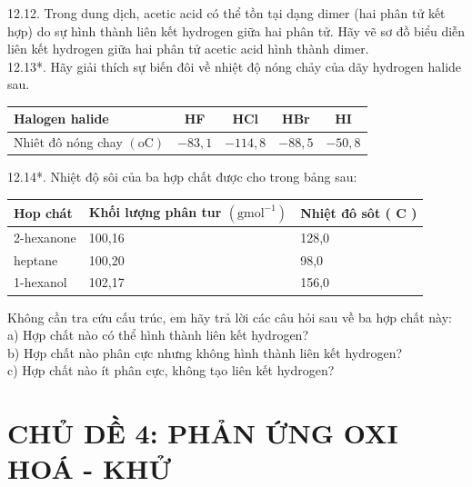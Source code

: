 \documentclass[10pt]{article}
\begin{document}
12.12. Trong dung dịch, acetic acid có thể tồn tại dạng dimer (hai phân tử kết hợp) do sự hình thành liên kết hydrogen giữa hai phân tử. Hãy vẽ sơ đồ biểu diễn liên kết hydrogen giữa hai phân tử acetic acid hình thành dimer.\\
12.13*. Hãy giải thích sự biến đôi về nhiệt độ nóng chảy của dãy hydrogen halide sau.

\begin{center}
\begin{tabular}{|l|c|c|c|c|}
\hline
Halogen halide & HF & HCl & HBr & HI \\
\hline
Nhiêt đô nóng chay $(\mathrm{o} \mathrm{C})$ & $-83,1$ & $-114,8$ & $-88,5$ & $-50,8$ \\
\hline
\end{tabular}
\end{center}

12.14*. Nhiệt độ sôi của ba hợp chất được cho trong bảng sau:

\begin{center}
\begin{tabular}{|l|l|l|}
\hline
Hop chát & Khối lượng phân tur $\left(\mathrm{g} \mathrm{mol}^{-1}\right)$ & Nhiệt đô sôt ( C ) \\
\hline
2-hexanone & 100,16 & 128,0 \\
\hline
heptane & 100,20 & 98,0 \\
\hline
1-hexanol & 102,17 & 156,0 \\
\hline
\end{tabular}
\end{center}

Không cần tra cứu cấu trúc, em hãy trả lời các câu hỏi sau về ba hợp chất này:\\
a) Hợp chất nào có thể hình thành liên kết hydrogen?\\
b) Hợp chất nào phân cực nhưng không hình thành liên kết hydrogen?\\
c) Hợp chất nào ít phân cực, không tạo liên kết hydrogen?

\section*{CHỦ DỀ 4: PHẢN ỨNG OXI HOÁ - KHỬ}
\end{document}
